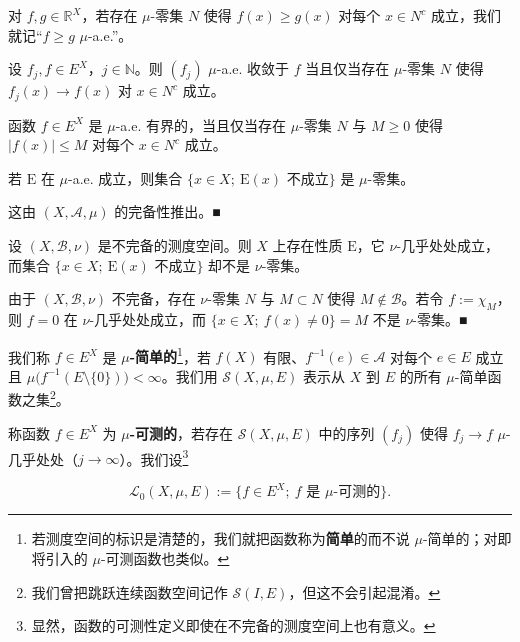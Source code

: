 \begin{example}

\begin{items}
\item

对 $ f, g \in \mathbb{R}^X $，若存在 $ \mu $-零集 $ N $ 使得 $ f(x) \ge g(x) $ 对每个 $ x \in N^c $ 成立，我们就记“$ f \ge g $ $ \mu $-a.e.”。

\item

设 $ f_j, f \in E^X $，$ j \in \mathbb{N} $。则 $ (f_j) $ $ \mu $-a.e. 收敛于 $ f $ 当且仅当存在 $ \mu $-零集 $ N $ 使得 $ f_j(x) \to f(x) $ 对 $ x \in N^c $ 成立。

\item

函数 $ f \in E^X $ 是 $ \mu $-a.e. 有界的，当且仅当存在 $ \mu $-零集 $ N $ 与 $ M \ge 0 $ 使得 $ |f(x)| \le M $ 对每个 $ x \in N^c $ 成立。

\item

若 $ \mathrm{E} $ 在 $ \mu $-a.e. 成立，则集合 $ \{ x \in X ;\ \mathrm{E}(x) \text{ 不成立} \} $ 是 $ \mu $-零集。

\proofhead
这由 $ (X,\mathcal{A},\mu) $ 的完备性推出。\nobreak\hspace{0.35em}■
\item

设 $ (X,\mathcal{B},\nu) $ 是不完备的测度空间。则 $ X $ 上存在性质 $ \mathrm{E} $，它 $ \nu $-几乎处处成立，而集合 $ \{ x \in X ;\ \mathrm{E}(x) \text{ 不成立} \} $ 却不是 $ \nu $-零集。

\proofhead
由于 $ (X,\mathcal{B},\nu) $ 不完备，存在 $ \nu $-零集 $ N $ 与 $ M \subset N $ 使得 $ M \notin \mathcal{B} $。若令 $ f := \chi_M $，则 $ f = 0 $ 在 $ \nu $-几乎处处成立，而 $ \{ x \in X ;\ f(x) \neq 0 \} = M $ 不是 $ \nu $-零集。\nobreak\hspace{0.35em}■
\end{items}

我们称 $ f \in E^X $ 是 \textbf{$ \mu $-简单的}\footnote{若测度空间的标识是清楚的，我们就把函数称为\textbf{简单}的而不说 $ \mu $-简单的；对即将引入的 $ \mu $-可测函数也类似。}，若 $ f(X) $ 有限、$ f^{-1}(e) \in \mathcal{A} $ 对每个 $ e \in E $ 成立且 $ \mu\bigl(f^{-1}(E \setminus \{0\})\bigr) < \infty $。我们用 $ \mathcal{S}(X,\mu,E) $ 表示从 $ X $ 到 $ E $ 的所有 $ \mu $-简单函数之集\footnote{我们曾把跳跃连续函数空间记作 $ \mathcal{S}(I,E) $，但这不会引起混淆。}。

称函数 $ f \in E^X $ 为 \textbf{$ \mu $-可测的}，若存在 $ \mathcal{S}(X,\mu,E) $ 中的序列 $ (f_j) $ 使得 $ f_j \to f $ $ \mu $-几乎处处（$ j \to \infty $）。我们设\footnote{显然，函数的可测性定义即使在不完备的测度空间上也有意义。}

\[
\mathcal{L}_0(X,\mu,E) := \{ f \in E^X ;\ f \text{ 是 } \mu\text{-可测的} \} .
\]
\end{example}

